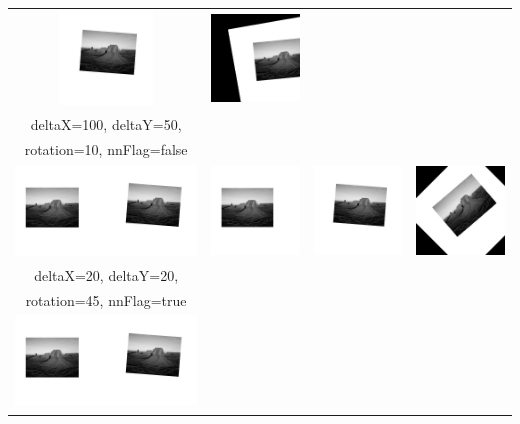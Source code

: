 \documentclass[12pt,german]{article}
\begin{document}
\begin{table}[H]
\begin{tabular}{| c | c | c | c |}
    \includegraphics[width=2.5cm]{images/register/second-half-image-01.jpg} &
    \includegraphics[width=2.5cm]{images/register/transformed-image-02.jpg} \\
     deltaX=100, deltaY=50,\\ rotation=10, nnFlag=false \\
    \hline
    \includegraphics[width=5cm]{images/register/gray1.jpg}  &
    \includegraphics[width=2.5cm]{images/register/first-half-image-01.jpg} &
    \includegraphics[width=2.5cm]{images/register/second-half-image-01.jpg} &
    \includegraphics[width=2.5cm]{images/register/transformed-image-03.jpg} \\
    \hline
	deltaX=20, deltaY=20, \\ rotation=45, nnFlag=true \\
     \hline
    \includegraphics[width=5cm]{images/register/gray1.jpg}  &

\end{tabular}
\end{table}
\end{document}
